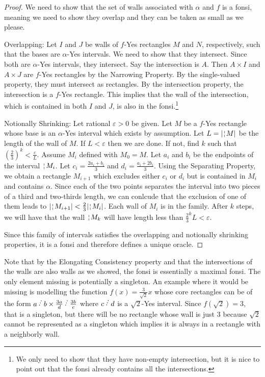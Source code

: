 \documentclass[12pt]{article}
\theoremstyle{remark}
\begin{document}
\begin{proof}
We need to show that the set of walls associated with $\alpha$ and $f$ is a fonsi, meaning we need to show they overlap and they can be taken as small as we please.

Overlapping: Let $I$ and $J$ be walls of $f$-Yes rectangles $M$ and $N$, respectively, such that the bases are $\alpha$-Yes intervals. We need to show that they intersect. Since both are $\alpha$-Yes intervals, they intersect. Say the intersection is $A$. Then $A\times I$ and $A \times J$ are $f$-Yes rectangles by the Narrowing Property. By the single-valued property, they must intersect as rectangles. By the intersection property, the intersection is a $f$-Yes rectangle. This implies that the wall of the intersection, which is contained in both $I$ and $J$, is also in the fonsi.\footnote{We only need to show that they have non-empty intersection, but it is nice to point out that the fonsi already contains all the intersections.}

Notionally Shrinking: Let rational $\varepsilon > 0$ be given. Let $M$ be a $f$-Yes rectangle whose base is an $\alpha$-Yes interval which exists by assumption. Let $L = |\wall{M}|$ be the length of the wall of $M$. If $L < \varepsilon$ then we are done. If not, find $k$ such that $(\frac{2}{3})^k < \frac{\varepsilon}{L}$. Assume $M_i$ defined with $M_0 = M$. Let $a_i$ and $b_i$ be the endpoints of the interval  $\wall{M_i}$. Let $c_i =\frac{2a_i + b_i}{3}$ and $d_i = \frac{a_i +2b_i}{3}$. Using the Separating Property, we obtain a rectangle $M_{i+1}$ which excludes either $c_i$ or $d_i$ but is contained in $M_i$ and contains $\alpha$. Since each of the two points separates the interval into two pieces of a third and two-thirds length, we can conlcude that the exclusion of one of them leads to $|\wall{M_{i+1}}| < \frac{2}{3} |\wall{M_i}|$. Each wall of $M_i$ is in the family. After $k$ steps, we will have that the wall $\wall{M_k}$ will have length less than $\frac{2}{3}^k L < \varepsilon $.  

Since this family of intervals satisfies the overlapping and notionally shrinking properties, it is a fonsi and therefore defines a unique oracle. 
\end{proof}

Note that by the Elongating Consistency property and that the intersections of the walls are also walls as we showed, the fonsi is essentially a maximal fonsi. The only element missing is potentially a singleton. An example where it would be missing is modelling the function $f(x) = \frac{3}{\sqrt{2}}x$ whose core rectangles can be of the form $a\lte b \times \frac{3a}{d} \lte \frac{3b}{c}$ where $c\lte d$ is a $\sqrt{2}$-Yes interval.  Since $f(\sqrt{2}) = 3$, that is a singleton, but there will be no rectangle whose wall is just $3$ because $\sqrt{2}$ cannot be represented as a singleton which implies it is always in a rectangle with a neighborly wall. 
\end{document}
